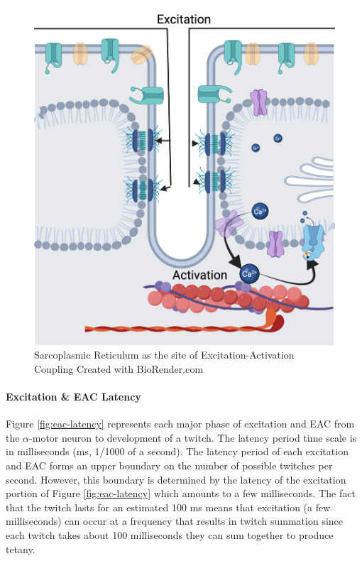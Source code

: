 \begin{figure}[!ht]
    \centering
    \includegraphics[width=1\linewidth]{./figure/SR.png}
    \caption{Sarcoplasmic Reticulum as the site of Excitation-Activation Coupling \footnotesize{Created with BioRender.com}}
    \label{fig:SR}
\end{figure}

\paragraph{Excitation \& EAC Latency}

Figure \ref{fig:eac-latency} represents each major phase of excitation and EAC from the $\alpha$-motor neuron to development of a twitch. The latency period time scale is in milliseconds (ms, 1/1000 of a second). The latency period of each excitation and EAC forms an upper boundary on the number of possible twitches per second. However, this boundary is determined by the latency of the excitation portion of Figure \ref{fig:eac-latency} which amounts to a few milliseconds. The fact that the twitch lasts for an estimated 100 ms means that excitation (a few milliseconds) can occur at a frequency that results in twitch summation since each twitch takes about 100 milliseconds they can sum together to produce tetany.

